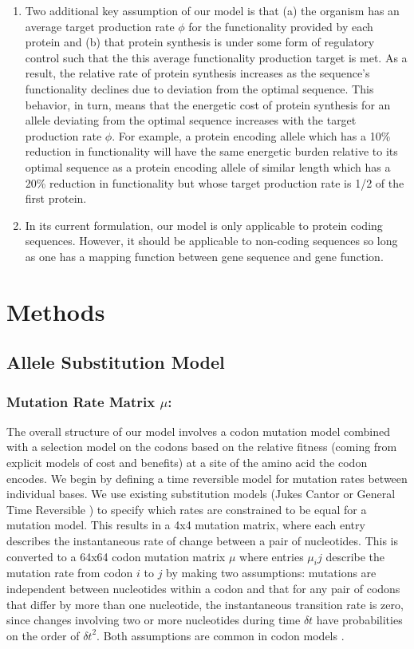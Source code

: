 \documentclass{article}
\newcommand{\deltaT}{\ensuremath{\delta t}\xspace}
\begin{document}
\begin{enumerate}
\item Two additional key assumption of our model is that (a) the organism has an average target production rate $\phi$ for the functionality provided by each protein and (b) that protein synthesis is under some form of  regulatory control such that the this average functionality production target is met.
As a result, the relative rate of protein synthesis increases as the sequence's functionality declines due to deviation from the optimal sequence.
This behavior, in turn, means that the energetic cost of protein synthesis for an allele deviating from the optimal sequence increases with the target production rate $\phi$.
For example, a protein encoding allele which has a 10\% reduction in functionality will have the same energetic burden relative to its optimal sequence as a protein encoding allele of similar length which has a 20\% reduction in functionality but whose target production rate is 1/2 of the first protein.
\item In its current formulation, our model is only applicable to protein coding sequences.
However, it should be applicable to non-coding sequences so long as one has a mapping function between gene sequence and gene function.
\end{enumerate}




\section*{Methods}\label{sec:methods}
\subsection*{Allele Substitution Model}
\subsubsection*{Mutation Rate Matrix $\mu$: }
The overall structure of our model involves a codon mutation model combined with a selection model on the codons based on the relative fitness (coming from explicit models of cost and benefits) at a site of the amino acid the codon encodes.
We begin by defining a time reversible model for mutation rates between individual bases.
We use existing substitution models (Jukes Cantor \citet{JukesAndCantor69} or General Time Reversible \citet{GTR}) to specify which rates are constrained to be equal for a mutation model.
This results in a 4x4 mutation matrix, where each entry describes the instantaneous rate of change between a pair of nucleotides.
This is converted to a 64x64 codon mutation matrix $\mu$ where entries $\mu_ij$ describe the mutation rate from codon $i$ to $j$ by making two assumptions: mutations are independent between nucleotides within a codon and that for any pair of codons that differ by more than one nucleotide, the instantaneous transition rate is zero, since changes involving two or more nucleotides during time \deltaT have probabilities on the order of $\deltaT^2$.
Both assumptions are common in codon models \cite{CITATIONS}.
\end{document}

